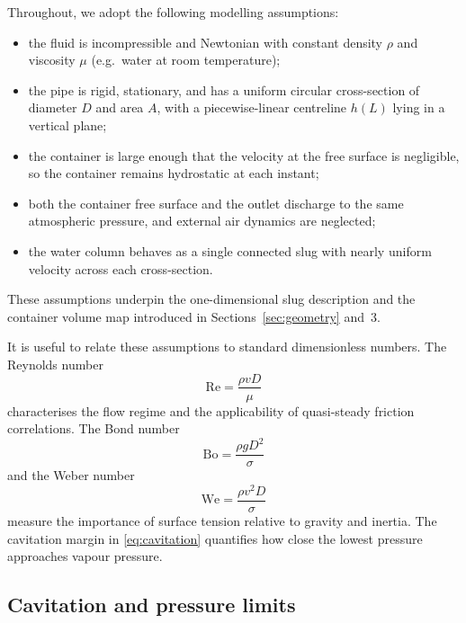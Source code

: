 \documentclass[11pt]{article}
\begin{document}
Throughout, we adopt the following modelling assumptions:
\begin{itemize}
  \item the fluid is incompressible and Newtonian with constant density $\rho$ and viscosity
        $\mu$ (e.g.\ water at room temperature);
  \item the pipe is rigid, stationary, and has a uniform circular cross-section of diameter $D$
        and area $A$, with a piecewise-linear centreline $h(L)$ lying in a vertical plane;
  \item the container is large enough that the velocity at the free surface is negligible, so the
        container remains hydrostatic at each instant;
  \item both the container free surface and the outlet discharge to the same atmospheric pressure,
        and external air dynamics are neglected;
  \item the water column behaves as a single connected slug with nearly uniform velocity across
        each cross-section.
\end{itemize}
These assumptions underpin the one-dimensional slug description and the container volume map introduced in Sections~\ref{sec:geometry} and~3.

It is useful to relate these assumptions to standard dimensionless numbers. The Reynolds number
\[
  \mathrm{Re} = \frac{\rho v D}{\mu}
\]
characterises the flow regime and the applicability of quasi-steady friction correlations.
The Bond number
\[
  \mathrm{Bo} = \frac{\rho g D^2}{\sigma}
\]
and the Weber number
\[
  \mathrm{We} = \frac{\rho v^2 D}{\sigma}
\]
measure the importance of surface tension relative to gravity and inertia. The cavitation margin in \cref{eq:cavitation} quantifies how close the lowest pressure approaches vapour pressure.

\subsection{Cavitation and pressure limits}
\end{document}
